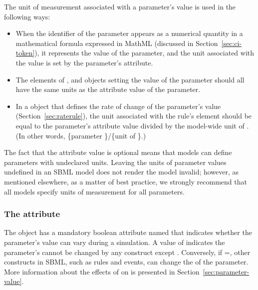The unit of measurement associated with a parameter's value is
used in the following ways:
\begin{itemize}

\item When the identifier of the parameter appears as a numerical
  quantity in a mathematical formula expressed in MathML
  (discussed in Section~\ref{sec:ci-token}), it represents the
  value of the parameter, and the unit associated with the value
  is set by the parameter's  attribute.

\item The  elements of \AssignmentRule,
  \InitialAssignment and \EventAssignment objects setting the
  value of the parameter should all have the same units as the
   attribute value of the parameter.

\item In a \RateRule object that defines the rate of change of the
  parameter's value (Section~\ref{sec:raterule}), the unit
  associated with the rule's  element should be equal
  to the parameter's  attribute value divided by the
  model-wide unit of .  (In other words,
  \{parameter \}/\{unit of \}.)

\end{itemize}

The fact that the  attribute value is optional means
that models can define parameters with undeclared units.  Leaving
the units of parameter values undefined in an SBML model does not
render the model invalid; however, as mentioned elsewhere, as a
matter of best practice, we strongly recommend that all models
specify units of measurement for all parameters.


\subsubsection{The  attribute}
\label{sec:parameter-constant}

The \Parameter object has a mandatory boolean attribute named
 that indicates whether the parameter's value can
vary during a simulation.  A value of  indicates the
parameter's  cannot be changed by any construct
except \InitialAssignment.  Conversely, if
=, other constructs in SBML, such as
rules and events, can change the  of the parameter.
More information about the effects of  on
 is presented in Section~\ref{sec:parameter-value}.

